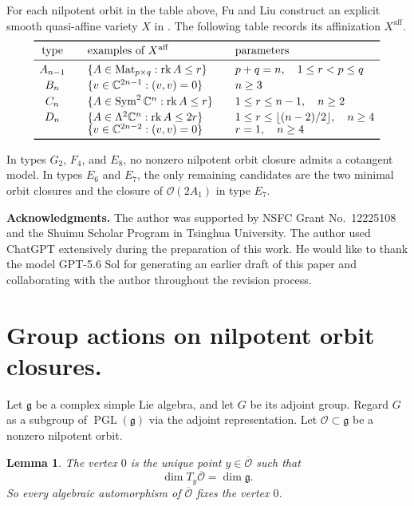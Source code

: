 \documentclass[10pt,a4paper]{amsart}
\newtheorem{lemma}[theorem]{Lemma}
\DeclareMathOperator{\rk}{rk}
\DeclareMathOperator{\Sym}{Sym}
\DeclareMathOperator{\Mat}{Mat}
\newcommand{\C}{\mathbb C}
\newcommand{\aff}{\mathrm{aff}}
\begin{document}
For each nilpotent orbit in the table above, Fu and Liu construct an
explicit smooth quasi-affine variety $X$ in
\cite[Table 1 and Theorems 1.4 and 4.2]{FuLiu}.
The following table records its affinization $X^{\aff}$.
\[
\begin{array}{c@{\qquad}l@{\qquad}l}
\toprule
\text{type}&\text{examples of }X^{\aff}&\text{parameters}\\
\midrule
A_{n-1}&\{A\in\Mat_{p\times q}:\rk A\leq r\}
&p+q=n,\quad 1\leq r<p\leq q\\[2pt]
B_n&\{v\in\C^{2n-1}:(v,v)=0\}
&n\geq3\\[2pt]
C_n&\{A\in\Sym^2\C^n:\rk A\leq r\}
&1\leq r\leq n-1,\quad n\geq2\\[2pt]
D_n&\{A\in\Lambda^2\C^n:\rk A\leq2r\}
&1\leq r\leq\lfloor(n-2)/2\rfloor,\quad n\geq4\\[-1pt]
&\{v\in\C^{2n-2}:(v,v)=0\}
&r=1,\quad n\geq4\\
\bottomrule
\end{array}
\]

In types $G_2$, $F_4$, and $E_8$, no nonzero nilpotent orbit closure
admits a cotangent model.
In types $E_6$ and $E_7$, the only remaining candidates are the two
minimal orbit closures and the closure of $\mathcal O(2A_1)$ in type
$E_7$.

\vspace{1em}
\textbf{Acknowledgments.}
The author was supported by NSFC Grant No.~12225108 and the Shuimu Scholar
Program in Tsinghua University. The author used ChatGPT extensively during
the preparation of this work. He would like to thank the model GPT-5.6 Sol
for generating an earlier draft of this paper and collaborating with the
author throughout the revision process.

\section{Group actions on nilpotent orbit closures.}

Let $\mathfrak g$ be a complex simple Lie algebra, and let $G$ be its
adjoint group.
Regard $G$ as a subgroup of $\operatorname{PGL}(\mathfrak g)$ via the
adjoint representation.
Let $\mathcal O\subset\mathfrak g$ be a nonzero nilpotent orbit.

\begin{lemma}\label{lem:intrinsic-vertex}
The vertex $0$ is the unique point $y\in\overline{\mathcal O}$ such that
\[
\dim T_y\overline{\mathcal O}=\dim\mathfrak g.
\]
So every algebraic automorphism of $\overline{\mathcal O}$ fixes the vertex $0$.
\end{lemma}
\end{document}
